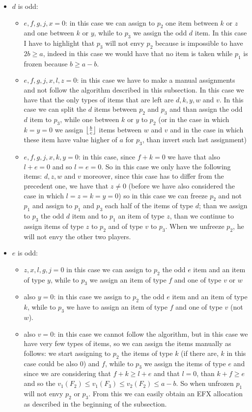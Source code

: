 \begin{itemize}
    \item $d$ is odd: \begin{itemize}
        \item $e,f,g,j,x=0$: in this case we can assign to $p_2$ one item between $k$ or $z$ and one between $k$ or $y$, while to $p_3$ we assign the odd $d$ item. In this case I have to highlight that $p_3$ will not envy $p_2$ because is impossible to have $2b\ge a$, indeed in this case we would have that no item is taken while $p_1$ is frozen because $b\ge a-b$.
        \item $e,f,g,j,x, l, z=0$: in this case we have to make a manual assignments and not follow the algorithm described in this subsection. In this case we have that the only types of items that are left are $d,k,y,w$ and $v$. In this case we can split the $d$ items between $p_2$ and $p_3$ and than assign the odd $d$ item to $p_3$, while one between $k$ or $y$ to $p_2$ (or in the case in which $k=y=0$ we assign $\left \lfloor\frac{b}{c}\right \rfloor$ items between $w$ and $v$ and in the case in which these item have value higher of $a$ for $p_3$, than invert such last assignment)
        \item $e,f,g,j,x,k,y=0$: in this case, since $f+k=0$ we have that also $l+e=0$ and so $l=e=0$. So in this case we only have the following items: $d,z,w$ and $v$ moreover, since this case has to differ from the precedent one, we have that $z\ne 0$ (before we have also considered the case in which $l=z=k=y=0$) so in this case we can freeze $p_2$ and not $p_1$ and assign to $p_1$ and $p_3$ each half of the items of type $d$; than we assign to $p_3$ the odd $d$ item and to $p_1$ an item of type $z$, than we continue to assign items of type $z$ to $p_2$ and of type $v$ to $p_3$. When we unfreeze $p_2$, he will not envy the other two players.
    \end{itemize}
    \item $e$ is odd:
    \begin{itemize}
        \item $z,x,l,g,j=0$ in this case we can assign to $p_2$ the odd $e$ item and an item of type $y$, while to $p_3$ we assign an item of type $f$ and one of type $v$ or $w$
        \item also $y=0$: in this case we assign to $p_2$ the odd $e$ item and an item of type $k$, while to $p_3$ we have to assign an item of type $f$ and one of type $v$ (not $w$).
        \item also $v = 0$: in this case we cannot follow the algorithm, but in this case we have very few types of items, so we can assign the items manually as follows: we start assigning to $p_2$ the items of type $k$ (if there are, $k$ in this case could be also $0$) and $f$, while to $p_3$ we assign the items of type $e$ and since we are considering that $f+k\ge l+e$ and that $l=0$, than $k+f\ge e$ and so the $v_1(F_2)\le v_1(F_3) \le v_2(F_2)\le a-b$. So when unfrozen $p_1$ will not envy $p_2$ or $p_3$. From this we can easily obtain an EFX allocation as described in the beginning of the subsection. 

\end{itemize}
\end{itemize}
